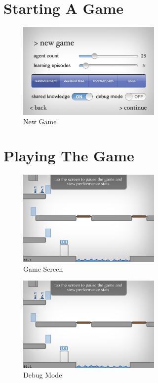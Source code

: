 \documentclass[a4paper,oneside]{report}
\begin{document}
\section{Starting A Game}

\begin{figure}[h!]
  \centering
    \includegraphics[width=70mm]{sources/images/NewGame}
    \caption{New Game}
\end{figure}

\section{Playing The Game}

\begin{figure}[h!]
  \centering
    \includegraphics[width=70mm]{sources/images/DebugMode}
    \caption{Game Screen}
\end{figure}

\begin{figure}[h!]
  \centering
    \includegraphics[width=70mm]{sources/images/DebugMode}
    \caption{Debug Mode}
\end{figure}
\end{document}
